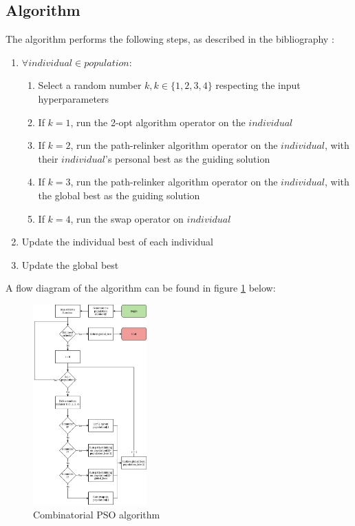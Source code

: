 \documentclass[conference]{IEEEtran}
\begin{document}
\subsection{Algorithm}
The algorithm performs the following steps, as described in the bibliography \cite{b8}:
\begin{enumerate}
    \item $\forall individual \in population$:
    \begin{enumerate}
        \item Select a random number $k, k \in \{1, 2, 3, 4\}$ respecting the input hyperparameters
        \item If $k = 1$, run the 2-opt algorithm operator on the $individual$
        \item If $k = 2$, run the path-relinker algorithm operator on the $individual$, with their $individual$'s personal best as the guiding solution
        \item If $k = 3$, run the path-relinker algorithm operator on the $individual$, with the global best as the guiding solution
        \item If $k = 4$, run the swap operator on $individual$
    \end{enumerate}
    \item Update the individual best of each individual
    \item Update the global best
\end{enumerate}

A flow diagram of the algorithm can be found in figure \ref{Combinatorial PSO algorithm} below:

\begin{figure}[h]
    \centering
    \includegraphics[width=0.39\textwidth]{images/pso.png}
    \caption{Combinatorial PSO algorithm} \label{Combinatorial PSO algorithm}
\end{figure}
\end{document}
